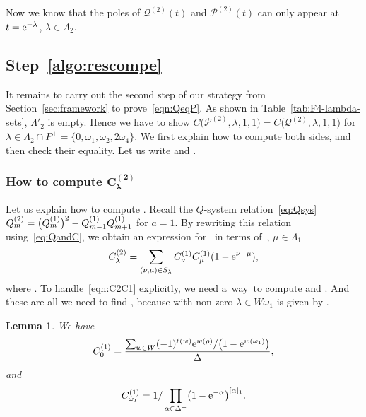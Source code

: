 \documentclass[pdftex]{sigma}
\numberwithin{equation}{section}
\newtheorem{Lemma}[Theorem]{Lemma}
\theoremstyle{definition}
\newcommand\posR{\Delta^{+}}
\newcommand\La{\Lambda}
\newcommand\la{\lambda}
\begin{document}
Now we know that the poles of $\mathcal{Q}^{(2)}(t)$ and $\mathcal{P}^{(2)}(t)$ can only appear at $t= {\rm e}^{-\la}$, $\la \in \La_2$.


\subsection[Step (ii)]{Step~\ref{algo:rescompe}}\label{ss:rescomp}
It remains to carry out the second step of our strategy from Section~\ref{sec:framework} to prove~\eqref{eqn:QeqP}.
As shown in Table~\ref{tab:F4-lambda-sets}, $\La'_2$ is empty. Hence we have to show
$
C\bigl(\mathcal{P}^{(2)},\la,1,1\bigr) = C\bigl(\mathcal{Q}^{(2)},\la,1,1\bigr)
$
for $\la \in \La_2\cap P^+=\{0,\omega_1,\omega_2,2 \omega_4\}$. We first explain how to compute both sides, and then check their equality. Let us write \smash{$C^{(2)}_{\la}=C\bigl(\mathcal{Q}^{(2)},\la,1,1\bigr)$} and \smash{$D^{(2)}_{\la}= C\bigl(\mathcal{P}^{(2)},\la,1,1\bigr)$}.

\subsubsection*{How to compute $\boldsymbol{C^{(2)}_{\la}}$}
Let us explain how to compute \smash{$C^{(2)}_{\la}$}.
Recall the $Q$-system relation~\eqref{eq:Qsys}
$
\smash{Q^{(2)}_{m} = \bigl(Q^{(1)}_{m}\bigr)^2 }- \smash{Q^{(1)}_{m-1}Q^{(1)}_{m+1}}
$
for $a=1$.
By rewriting this relation using~\eqref{eq:QandC}, we obtain an expression for~\smash{$C^{(2)}_{\la}$} in terms of~, $\mu \in \La_1$
\begin{equation}\label{eqn:C2C1}
C^{(2)}_{\la} = \sum_{(\nu,\mu) \in S_{\la}} C^{(1)}_{\nu}C^{(1)}_{\mu}(1-{\rm e}^{\nu-\mu}),
\end{equation}
where
\smash{$S_{\la} : =\{(\nu,\mu)\in \La_1\times \La_1\mid \nu \neq \mu,\, \nu+\mu = \la\}$}. To handle~\eqref{eqn:C2C1} explicitly, we need a~way~to compute  and . And these are all we need to
find , \smash{$\mu \in \La_1$} because \smash{$C^{(1)}_{\la}$} with non-zero $\la\in W\omega_1$ is given by .
\begin{Lemma}\label{lem:C10}
We have
\begin{equation}\label{C10}
C^{(1)}_{0} = \frac{\sum_{w\in W}(-1)^{\ell(w)}{\rm e}^{w(\rho)}/\bigl(1-{\rm e}^{w(\omega_1)}\bigr)}{\Delta},
\end{equation}
and
\[
C^{(1)}_{\omega_1} = 1/\prod_{\alpha\in \posR}\bigl(1-{\rm e}^{-\alpha}\bigr)^{[\alpha]_1}.
\]
\end{Lemma}
\end{document}
